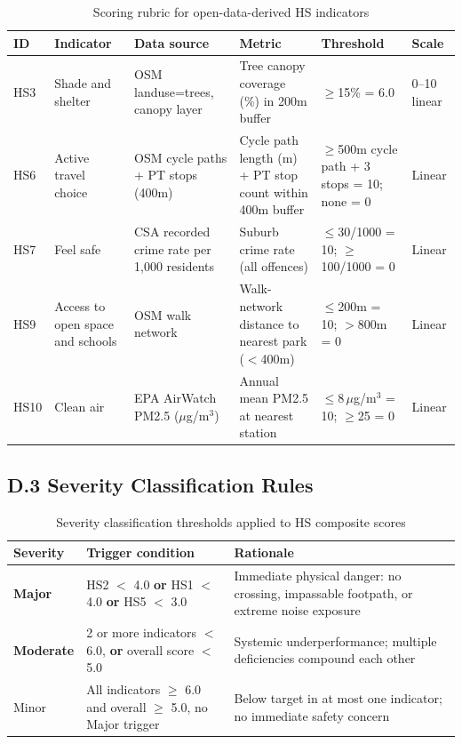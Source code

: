 \documentclass[11pt,a4paper]{article}
\begin{document}
\begin{table}[H]\centering\small
\caption{Scoring rubric for open-data-derived HS indicators}
\setlength{\tabcolsep}{4pt}
\begin{tabular}{C{0.6cm}L{2.8cm}L{3.8cm}L{3.8cm}L{2cm}L{1.8cm}}
\toprule
\textbf{ID} & \textbf{Indicator} & \textbf{Data source} & \textbf{Metric} & \textbf{Threshold} & \textbf{Scale} \\
\midrule
HS3 & Shade and shelter & OSM landuse=trees, canopy layer & Tree canopy coverage (\%) in 200m buffer & $\geq$15\% = 6.0 & 0--10 linear \\
\midrule
HS6 & Active travel choice & OSM cycle paths + PT stops (400m) & Cycle path length (m) + PT stop count within 400m buffer & $\geq$500m cycle path + 3 stops = 10; none = 0 & Linear \\
\midrule
HS7 & Feel safe & CSA recorded crime rate per 1,000 residents & Suburb crime rate (all offences) & $\leq$30/1000 = 10; $\geq$100/1000 = 0 & Linear \\
\midrule
HS9 & Access to open space and schools & OSM walk network & Walk-network distance to nearest park ($<$400m) & $\leq$200m = 10; $>$800m = 0 & Linear \\
\midrule
HS10 & Clean air & EPA AirWatch PM2.5 ($\mu$g/m$^3$) & Annual mean PM2.5 at nearest station & $\leq$8\,$\mu$g/m$^3$ = 10; $\geq$25 = 0 & Linear \\
\bottomrule
\end{tabular}
\end{table}

\subsection*{D.3 Severity Classification Rules}

\begin{table}[H]\centering\small
\caption{Severity classification thresholds applied to HS composite scores}
\begin{tabular}{L{2.5cm}L{6cm}L{5.5cm}}
\toprule
\textbf{Severity} & \textbf{Trigger condition} & \textbf{Rationale} \\
\midrule
\textcolor{majorred}{\textbf{Major}}    & HS2 $<$ 4.0 \textbf{or} HS1 $<$ 4.0 \textbf{or} HS5 $<$ 3.0 & Immediate physical danger: no crossing, impassable footpath, or extreme noise exposure \\
\textcolor{moderateyellow}{\textbf{Moderate}} & 2 or more indicators $<$ 6.0, \textbf{or} overall score $<$ 5.0 & Systemic underperformance; multiple deficiencies compound each other \\
Minor & All indicators $\geq$ 6.0 and overall $\geq$ 5.0, no Major trigger & Below target in at most one indicator; no immediate safety concern \\
\bottomrule
\end{tabular}
\end{table}
\end{document}
